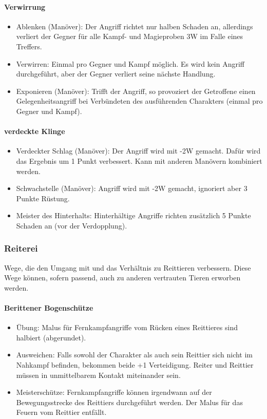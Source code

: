\documentclass{article}
\begin{document}
\paragraph{Verwirrung}

\begin{itemize}
\item Ablenken (Manöver): Der Angriff richtet nur halben Schaden an, allerdings verliert der Gegner für alle Kampf- und Magieproben 3W im Falle eines Treffers.
\item Verwirren: Einmal pro Gegner und Kampf möglich. Es wird kein Angriff durchgeführt, aber der Gegner verliert seine nächste Handlung.
\item Exponieren (Manöver): Trifft der Angriff, so provoziert der Getroffene einen Gelegenheitsangriff bei Verbündeten des ausführenden Charakters (einmal pro Gegner und Kampf).
\end{itemize}

\paragraph{verdeckte Klinge}

\begin{itemize}
\item Verdeckter Schlag (Manöver): Der Angriff wird mit -2W gemacht. Dafür wird das Ergebnis um 1 Punkt verbessert. Kann mit anderen Manövern kombiniert werden.
\item Schwachstelle (Manöver): Angriff wird mit -2W gemacht, ignoriert aber 3 Punkte Rüstung.
\item Meister des Hinterhalts: Hinterhältige Angriffe richten zusätzlich 5 Punkte Schaden an (vor der Verdopplung).
\end{itemize}

\subsubsection{Reiterei}

Wege, die den Umgang mit und das Verhältnis zu Reittieren verbessern. Diese Wege können, sofern passend, auch zu
anderen vertrauten Tieren erworben werden.

\paragraph{Berittener Bogenschütze}

\begin{itemize}
\item Übung: Malus für Fernkampfangriffe vom Rücken eines Reittieres sind halbiert (abgerundet).
\item Ausweichen: Falls sowohl der Charakter als auch sein Reittier sich nicht im Nahkampf befinden, bekommen beide +1 Verteidigung. Reiter und Reittier müssen in unmittelbarem Kontakt miteinander sein.
\item Meisterschütze: Fernkampfangriffe können irgendwann auf der Bewegungsstrecke des Reittiers durchgeführt werden. Der Malus für das Feuern vom Reittier entfällt.
\end{itemize}
\end{document}

